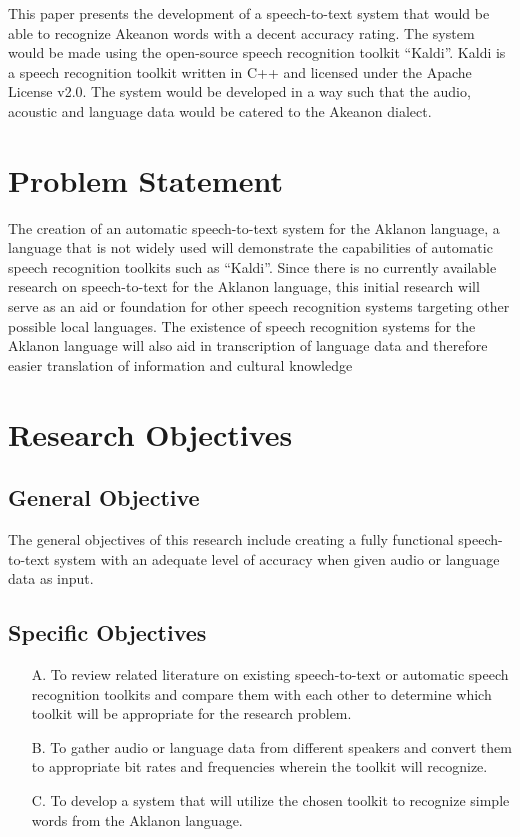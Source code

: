 This paper presents the development of a speech-to-text system that would be able to recognize Akeanon words with a decent accuracy rating. The system would be made using the open-source speech recognition toolkit “Kaldi”. Kaldi is a speech recognition toolkit written in C++ and licensed under the Apache License v2.0. The system would be developed in a way such that the audio, acoustic and language data would be catered to the Akeanon dialect.


\section{Problem Statement}

The creation of an automatic speech-to-text system for the Aklanon language, a language that is not widely used will demonstrate the capabilities of automatic speech recognition toolkits such as “Kaldi”.  Since there is no currently available research on speech-to-text for the Aklanon language, this initial research will serve as an aid or foundation for other speech recognition systems targeting other possible local languages. The existence of speech recognition systems for the Aklanon language will also aid in transcription of language data and therefore easier translation of information and cultural knowledge

\section{Research Objectives}


\subsection{General Objective}

The general objectives of this research include creating a fully functional speech-to-text system with an adequate level of accuracy when given audio or language data as input. 


\subsection{Specific Objectives}
\begin{itemize}
\item[A.] To review related literature on existing speech-to-text or automatic speech recognition toolkits and compare them with each other to determine which toolkit will be appropriate for the research problem. 

\item[B.] To gather audio or language data from different speakers and convert them to appropriate bit rates and frequencies wherein the toolkit will recognize. 

\item[C.] To develop a system that will utilize the chosen toolkit to recognize simple words from the Aklanon language.
\end{itemize}



